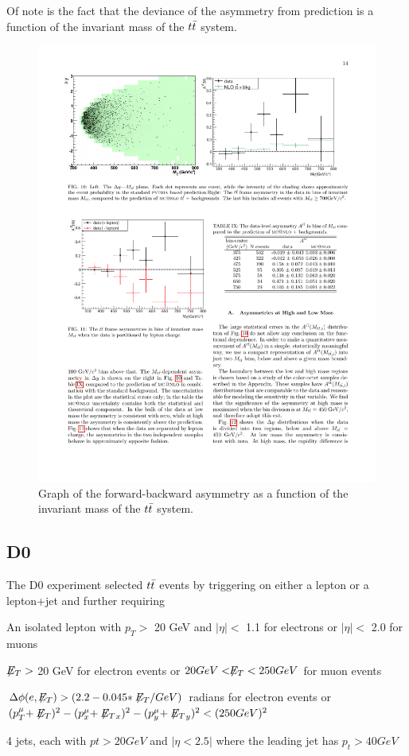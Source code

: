 Of note is the fact that the deviance of the asymmetry from prediction is a function of the invariant mass of the $t\bar{t}$ system.

\begin{figure}
  \begin{center}
    \includegraphics[width=125mm]{figures/theory/CDFAsymmetryMass}
  \end{center}
  \caption{Graph of the forward-backward asymmetry as a function of the invariant mass of the $t\bar{t}$ system.}
  \label{img:CDFAsymmetryMass}
\end{figure}


\subsection{D0}

The D0 experiment selected $t\bar{t}$ events by triggering on either a lepton or a lepton+jet and further requiring
\begin{tabular}
  \item An isolated lepton with $p_T >$ 20 GeV and $|\eta| < $ 1.1 for electrons or $|\eta| < $ 2.0 for muons
  \item $\not\!\!{E_{T}} >$ 20 GeV for electron events or $20 GeV < \not\!\!{E_{T}} < 250 GeV$ for muon events
  \item $\Delta \phi(e, \not\!\!{E_{T}}) > (2.2 - 0.045*\not\!\!{E_{T}} / GeV)$ radians for electron events or $(p_T^\mu + \not\!\!{E_{T}})^2 - (p_x^\mu + \not\!\!{E_{T}}_x)^2 - (p_y^\mu + \not\!\!{E_{T}}_y)^2 < (250 GeV)^2$
  \item 4 jets, each with $pt > 20 GeV$ and $|\eta < 2.5|$ where the leading jet has $p_t > 40 GeV$
\end{tabular}




